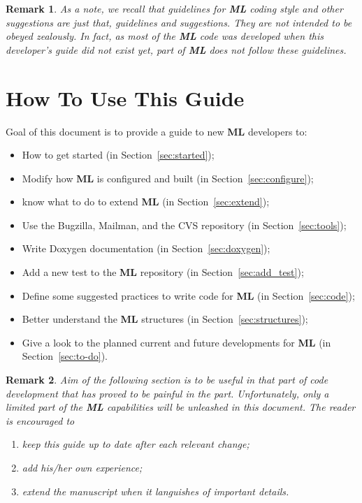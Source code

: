 \documentclass[10pt,letter,relax]{SANDreport}
\newtheorem{remark}{Remark}
\newcommand{\ML}     {{\bf ML }}
\begin{document}
\begin{remark}
  As a note, we recall that guidelines for \ML coding style and other
  suggestions are just that, guidelines and
  suggestions. They are not intended to be obeyed zealously.
  In fact, as most of the \ML code was developed when this developer's
  guide did not exist yet, part of \ML does not follow these guidelines.
\end{remark}


\section{How To Use This Guide}
\label{sec:how}

Goal of this document is to provide a guide to new \ML
developers to:
\begin{itemize}
\item How to get started (in Section~\ref{sec:started});
\item Modify how \ML is configured and built (in Section~\ref{sec:configure});
\item know what to do to extend \ML (in Section~\ref{sec:extend});
\item Use the Bugzilla, Mailman, and the CVS repository 
  (in Section~\ref{sec:tools});
\item Write Doxygen documentation (in Section~\ref{sec:doxygen});
\item Add a new test to the \ML repository (in Section~\ref{sec:add_test});
\item Define some suggested practices to write code for \ML (in Section~\ref{sec:code});
\item Better understand the \ML structures (in Section~\ref{sec:structures});
\item Give a look to the planned current and future developments for \ML (in
  Section~\ref{sec:to-do}).
\end{itemize}

\begin{remark}
  Aim of the following section is to be useful in that part of code
  development that has proved to be painful in the part. Unfortunately,
  only a limited part of the \ML capabilities will be unleashed in this
  document. The reader is
  encouraged to
  \begin{enumerate}
    \item keep this guide up to date after each relevant change;
    \item add his/her own experience;
    \item extend the manuscript when it languishes of important details.
  \end{enumerate}
\end{remark}
\end{document}
